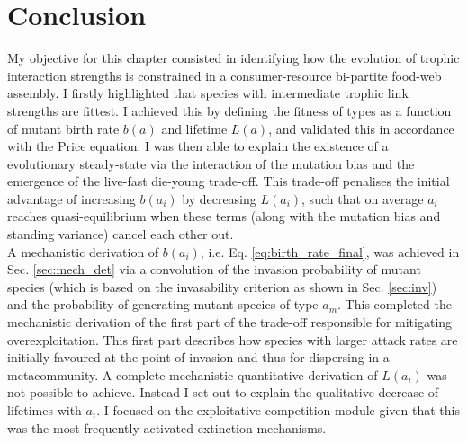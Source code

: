 \documentclass[a4paper]{report}
\begin{document}
{\section{Conclusion}

My objective for this chapter consisted in identifying how the evolution of trophic interaction strengths is constrained in a consumer-resource bi-partite food-web assembly. I firstly highlighted that species with intermediate trophic link strengths are fittest. I achieved this by defining the fitness of types as a function of mutant birth rate $b(a)$  and lifetime $L(a)$, and validated this in accordance with the Price equation. I was then able to explain the existence of a evolutionary steady-state via the interaction of the mutation bias and the emergence of the live-fast die-young trade-off. This trade-off penalises the initial advantage of increasing $b(a_i)$ by decreasing $L(a_i)$, such that on average $a_i$ reaches quasi-equilibrium when these terms (along with the mutation bias and standing variance) cancel each other out. \\

A mechanistic derivation of $b(a_i)$, i.e. Eq. \eqref{eq:birth_rate_final}, was achieved in Sec. \ref{sec:mech_det} via a convolution of the invasion probability of mutant species (which is based on the invasability criterion as shown in Sec. \ref{sec:inv}) and the probability of generating mutant species of type $a_m$. This completed the mechanistic derivation of the first part of the trade-off responsible for mitigating overexploitation. This first part describes how species with larger attack rates are initially favoured at the point of invasion and thus for dispersing in a metacommunity. A complete mechanistic quantitative derivation of $L(a_i)$ was not possible to achieve. Instead I set out to explain the qualitative decrease of lifetimes with $a_i$. I focused on the exploitative competition module given that this was the most frequently activated extinction mechanisms.\\

}
\end{document}

